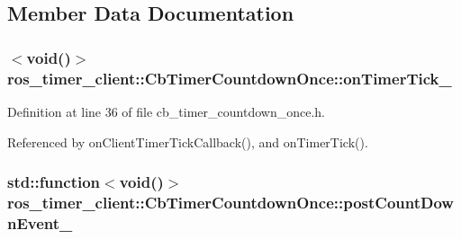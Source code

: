 \subsection{Member Data Documentation}
\subsubsection[{\texorpdfstring{on\+Timer\+Tick\+\_\+}{onTimerTick_}}]{$<$void()$>$ ros\+\_\+timer\+\_\+client\+::\+Cb\+Timer\+Countdown\+Once\+::on\+Timer\+Tick\+\_\+\hspace{0.3cm}{\ttfamily [private]}}\hypertarget{classros__timer__client_1_1CbTimerCountdownOnce_a9443c6372da3a1faa917d0e9ae7ebd90}{}\label{classros__timer__client_1_1CbTimerCountdownOnce_a9443c6372da3a1faa917d0e9ae7ebd90}


Definition at line 36 of file cb\+\_\+timer\+\_\+countdown\+\_\+once.\+h.



Referenced by on\+Client\+Timer\+Tick\+Callback(), and on\+Timer\+Tick().

\subsubsection[{\texorpdfstring{post\+Count\+Down\+Event\+\_\+}{postCountDownEvent_}}]{\setlength{\rightskip}{0pt plus 5cm}std\+::function$<$void()$>$ ros\+\_\+timer\+\_\+client\+::\+Cb\+Timer\+Countdown\+Once\+::post\+Count\+Down\+Event\+\_\+\hspace{0.3cm}{\ttfamily [private]}}\hypertarget{classros__timer__client_1_1CbTimerCountdownOnce_a57712ed15f37200e03a15d0c2e3d05fd}{}\label{classros__timer__client_1_1CbTimerCountdownOnce_a57712ed15f37200e03a15d0c2e3d05fd}


